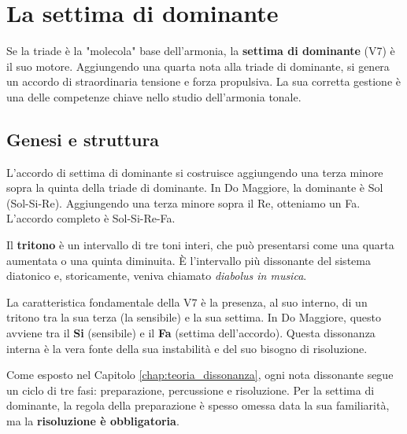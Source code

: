 \chapter{La settima di dominante}
\label{chap:settima_dominante}

Se la triade è la "molecola" base dell'armonia, la \textbf{settima di dominante} (V7) è il suo motore. Aggiungendo una quarta nota alla triade di dominante, si genera un accordo di straordinaria tensione e forza propulsiva. La sua corretta gestione è una delle competenze chiave nello studio dell'armonia tonale.

\section{Genesi e struttura}
\label{sec:genesi_v7}

L'accordo di settima di dominante si costruisce aggiungendo una terza minore sopra la quinta della triade di dominante. In Do Maggiore, la dominante è Sol (Sol-Si-Re). Aggiungendo una terza minore sopra il Re, otteniamo un Fa. L'accordo completo è Sol-Si-Re-Fa.

\begin{definizione}[Il Tritono]
	\label{def:tritono}
	Il \textbf{tritono} è un intervallo di tre toni interi, che può presentarsi come una quarta aumentata o una quinta diminuita. È l'intervallo più dissonante del sistema diatonico e, storicamente, veniva chiamato \textit{diabolus in musica}.
\end{definizione}

La caratteristica fondamentale della V7 è la presenza, al suo interno, di un tritono tra la sua terza (la sensibile) e la sua settima. In Do Maggiore, questo avviene tra il \textbf{Si} (sensibile) e il \textbf{Fa} (settima dell'accordo). Questa dissonanza interna è la vera fonte della sua instabilità e del suo bisogno di risoluzione.

\begin{esempio}
	\label{ex:tritono_v7}
\end{esempio}

\begin{regola}
        \label{reg:preparazione_risoluzione}
        Come esposto nel Capitolo \ref{chap:teoria_dissonanza}, ogni nota dissonante segue un ciclo di tre fasi: preparazione, percussione e risoluzione.
        Per la settima di dominante, la regola della preparazione è spesso omessa data la sua familiarità, ma la \textbf{risoluzione è obbligatoria}.
\end{regola}

